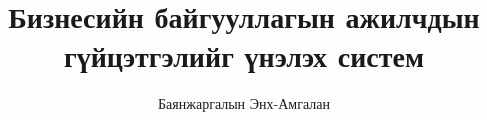 \documentclass[12pt,a4paper]{report}
\begin{document}
\title{Бизнесийн байгууллагын ажилчдын гүйцэтгэлийг үнэлэх систем}
\author{Баянжаргалын Энх-Амгалан}
\maketitle


\tableofcontents




\end{document}
